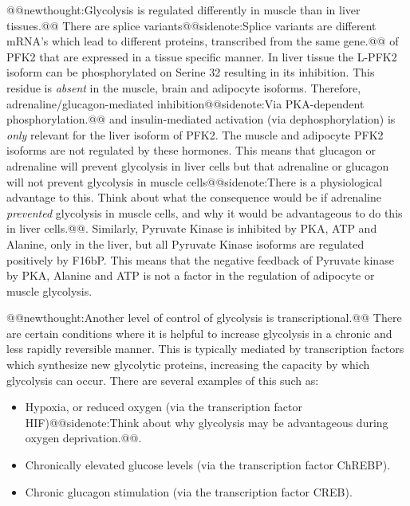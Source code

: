 \documentclass{tufte-handout}
\makeatletter
\def\newthought#1{@@newthought:#1@@}
\def\sidenote#1{@@sidenote:#1@@}
\makeatother
\begin{document}
\newthought{Glycolysis is regulated differently in muscle than in liver tissues.}  There are splice variants\sidenote{Splice variants are different mRNA's which lead to different proteins, transcribed from the same gene.} of PFK2 that are expressed in a tissue specific manner.  In liver tissue the L-PFK2 isoform can be phosphorylated on Serine 32 resulting in its inhibition.  This residue is \emph{absent} in the muscle, brain and adipocyte isoforms.  Therefore, adrenaline/glucagon-mediated inhibition\sidenote{Via PKA-dependent phosphorylation.} and insulin-mediated activation (via dephosphorylation) is \emph{only} relevant for the liver isoform of PFK2.  The muscle and adipocyte PFK2 isoforms are not regulated by these hormones.  This means that glucagon or adrenaline will prevent glycolysis in liver cells but that adrenaline or glucagon will not prevent glycolysis in muscle cells\sidenote{There is a physiological advantage to this.   Think about what the consequence would be if adrenaline \emph{prevented} glycolysis in muscle cells, and why it would be advantageous to do this in liver cells.}.  Similarly, Pyruvate Kinase is inhibited by PKA, ATP and Alanine, only in the liver, but all Pyruvate Kinase isoforms are regulated positively by F16bP.  This means that the negative feedback of Pyruvate kinase by PKA, Alanine and ATP is not a factor in the regulation of adipocyte or muscle glycolysis.  

\newthought{Another level of control of glycolysis is transcriptional.}  There are certain conditions where it is helpful to increase glycolysis in a chronic and less rapidly reversible manner.  This is typically mediated by transcription factors which synthesize new glycolytic proteins, increasing the capacity by which glycolysis can occur.  There are several examples of this such as:

\begin{itemize}
\item Hypoxia, or reduced oxygen (via the transcription factor HIF)\sidenote{Think about why glycolysis may be advantageous during oxygen deprivation.}.
\item Chronically elevated glucose levels (via the transcription factor ChREBP).
\item Chronic glucagon stimulation (via the transcription factor CREB).
\end{itemize}
\end{document}
